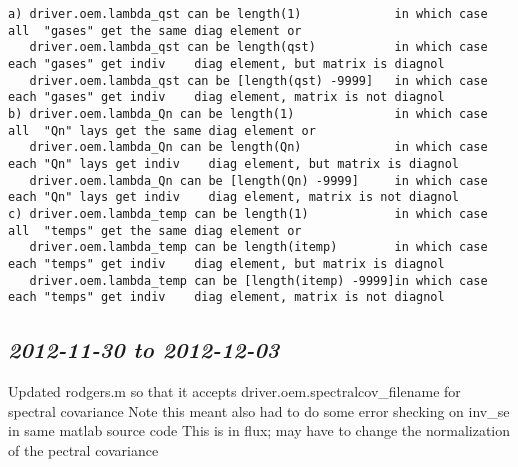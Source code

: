 \documentclass[11pt]{article}
\begin{document}
\begin{itemize}
\begin{small}
\begin{verbatim}
a) driver.oem.lambda_qst can be length(1)             in which case all  "gases" get the same diag element or
   driver.oem.lambda_qst can be length(qst)           in which case each "gases" get indiv    diag element, but matrix is diagnol
   driver.oem.lambda_qst can be [length(qst) -9999]   in which case each "gases" get indiv    diag element, matrix is not diagnol
b) driver.oem.lambda_Qn can be length(1)              in which case all  "Qn" lays get the same diag element or
   driver.oem.lambda_Qn can be length(Qn)             in which case each "Qn" lays get indiv    diag element, but matrix is diagnol
   driver.oem.lambda_Qn can be [length(Qn) -9999]     in which case each "Qn" lays get indiv    diag element, matrix is not diagnol
c) driver.oem.lambda_temp can be length(1)            in which case all  "temps" get the same diag element or
   driver.oem.lambda_temp can be length(itemp)        in which case each "temps" get indiv    diag element, but matrix is diagnol
   driver.oem.lambda_temp can be [length(itemp) -9999]in which case each "temps" get indiv    diag element, matrix is not diagnol
\end{verbatim}
\end{small}
\end{itemize}

\subsection{\textit{2012-11-30 to 2012-12-03}}
\label{sec-2_9}
Updated rodgers.m so that it accepts driver.oem.spectralcov_filename for spectral covariance
Note this meant also had to do some error shecking on inv_se in same matlab source code
This is in flux; may have to change the normalization of the pectral covariance
\end{document}
